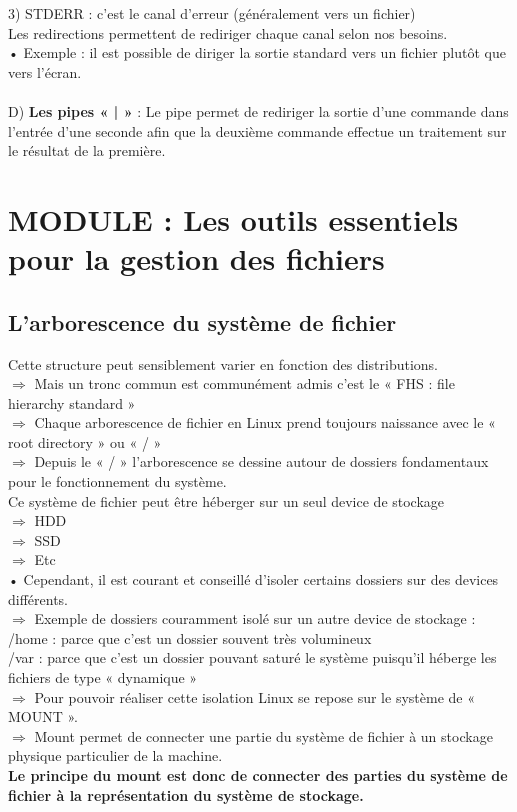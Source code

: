 \documentclass[a4paper, 11pt, french, oneside]{book}
\begin{document}
	3) {\color{red}STDERR} : c’est le canal d’erreur (généralement vers un fichier)\\
	
      Les redirections permettent de rediriger chaque canal selon nos besoins.\\

• Exemple : il est possible de diriger la sortie standard vers un fichier plutôt que vers l’écran.\\\\
D) \textbf{Les pipes « | »} :
Le pipe permet de rediriger la sortie d’une commande dans l’entrée d’une seconde afin que la deuxième commande effectue un traitement sur le résultat de la première.
\chapter{MODULE : Les outils essentiels pour la gestion des fichiers}
\section{\Large L’arborescence du système de fichier} 
 Cette structure peut sensiblement varier en fonction des distributions.\\
$\Rightarrow$ Mais un tronc commun est communément admis c’est le « FHS : file hierarchy
standard »\\
$\Rightarrow$ Chaque arborescence de fichier en Linux prend toujours naissance avec le
« root directory » ou « / »\\
$\Rightarrow$ Depuis le « / » l’arborescence se dessine autour de dossiers fondamentaux
pour le fonctionnement du système.\\
Ce système de fichier peut être héberger sur un seul device de stockage\\
$\Rightarrow$ HDD\\
$\Rightarrow$ SSD\\
$\Rightarrow$ Etc\\
• Cependant, il est courant et conseillé d’isoler certains dossiers sur des devices différents.\\
$\Rightarrow$ Exemple de dossiers couramment isolé sur un autre device de stockage :\\
 /home : parce que c’est un dossier souvent très volumineux\\
 /var : parce que c’est un dossier pouvant saturé le système puisqu’il héberge les fichiers de type « dynamique »\\
$\Rightarrow$ Pour pouvoir réaliser cette isolation Linux se repose sur le système de « MOUNT ».\\
$\Rightarrow$ Mount permet de connecter une partie du système de fichier à un stockage physique particulier de la machine.\\
\textbf{Le principe du mount est donc de connecter des parties du système de fichier à la représentation du système de stockage.}
\end{document}
